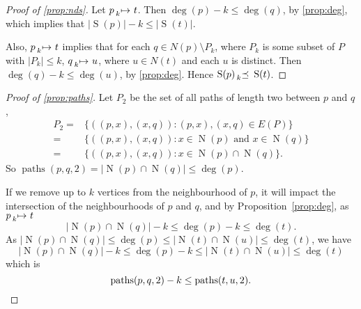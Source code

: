 \documentclass[letterpaper]{article}
\theoremstyle{definition}
\newcommand{\paths}{\operatorname{paths}}
\newcommand{\lessmap}[1]{\prescript{}{#1}{\mapsto}\ }
\newcommand{\lesspreceq}[1]{\prescript{}{#1}{\preceq}\ }
\newcommand{\N}{\operatorname{N}}
\newcommand{\nds}{\operatorname{S}}
\begin{document}
\begin{proof}[Proof of \cref{prop:nds}]
Let $p \lessmap{k} t$.  Then $\deg(p) - k \leq \deg(q)$, by \cref{prop:deg}, which
implies that $\left|\nds(p)\right| -k \leq \left| \nds(t) \right| $.

Also, $p \lessmap{k} t$ implies that for each $q \in N(p) \setminus P_k$, where $P_k$
is some subset of $P$ with $\left| P_k \right| \leq k$, $q \lessmap{k} u$, where $u \in N(t)$ and
each $u$ is distinct.  Then $\deg(q) - k \leq \deg(u)$, by \cref{prop:deg}.  Hence $\nds(p)
\lesspreceq{k} \nds(t)$.
\end{proof}

\begin{proof}[Proof of \cref{prop:paths}]
Let $P_{2}$ be the set of all paths of length two between $p$ and $q$,
\begin{align*}
P_{2} = & \{((p,x),(x,q)) : (p,x),(x,q)\in E(P) \} \\
 = & \{((p,x),(x,q)) : x\in \N(p) \text{ and } x\in \N(q) \} \\
 = & \{((p,x),(x,q)) : x\in \N(p)\cap \N(q) \} .
\end{align*}
So $\paths(p,q,2) = \left| \N(p)\cap \N(q) \right|  \leq \deg(p)$.

If we remove up to $k$ vertices from the neighbourhood of $p$, it will impact the intersection of the neighbourhoods of $p$ and $q$, and by Proposition~\ref{prop:deg}, as $p\lessmap{k}t$
\[
\left| \N(p)\cap \N(q)\right| - k \leq \deg(p) - k \leq \deg(t).
\]
As $\left|\N(p)\cap \N(q)\right|\leq \deg(p) \leq \left|\N(t)\cap \N(u)\right|\leq \deg(t)$, we have
\[
\left|\N(p)\cap \N(q)\right| - k \leq \deg(p) - k\leq \left|\N(t)\cap \N(u)\right|\leq \deg(t)
\]
which is
\[
\paths(p, q, 2) - k \leq \paths(t, u, 2). \qedhere
\]
\end{proof}
\end{document}
